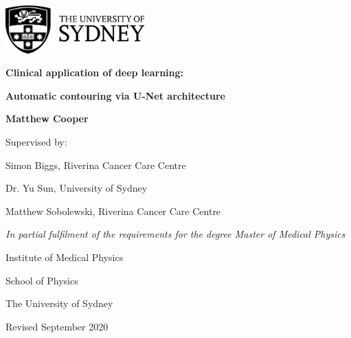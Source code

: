 \documentclass[a4paper,oneside, 12pt,parskip=half]{scrbook}
\begin{document}
\begin{titlepage}

\begin{center}
	\includegraphics[width=0.4\textwidth]{figures/usyd_logo}
\end{center}
	\vspace{2cm}
\begin{center}
	\LARGE\textbf{Clinical application of deep learning:}

	\LARGE\textbf{Automatic contouring via U-Net architecture}

	\vfill

	\normalsize
  \large{\textbf{Matthew Cooper}}

  \vfill

	\normalsize
	Supervised by:

	Simon Biggs, Riverina Cancer Care Centre

	Dr. Yu Sun, University of Sydney

	Matthew Sobolewski, Riverina Cancer Care Centre

	\vspace{1cm}

	\textit{In partial fulfilment of the requirements for the degree Master of Medical Physics}

	\vspace{1cm}

	Institute of Medical Physics

	School of Physics

	The University of Sydney

  \vspace{3cm}
  Revised September 2020

	\vfill
  \end{center}

\end{titlepage}


\frontmatter
\tableofcontents



\listoffigures
\listoftables


\mainmatter







\backmatter
\small{\printbibliography[title=References]}
\end{document}
